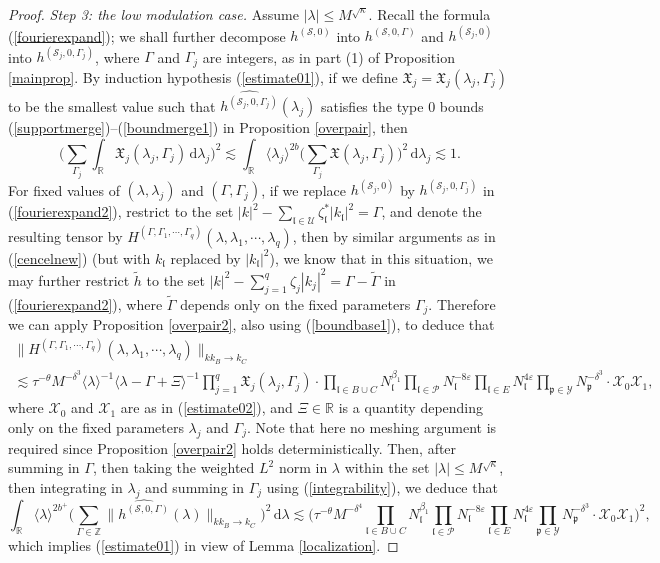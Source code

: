 \documentclass[11 pt,reqno]{amsart}
\theoremstyle{definition}
\theoremstyle{remark}
\numberwithin{equation}{section}
\newcommand{\Sc}{\mathcal{S}}
\newcommand{\Pc}{\mathcal{P}}
\newcommand{\Uc}{\mathcal{U}}
\newcommand{\Xc}{\mathcal{X}}
\newcommand{\Yc}{\mathcal{Y}}
\newcommand{\Rb}{\mathbb{R}}
\newcommand{\Zb}{\mathbb{Z}}
\newcommand{\pf}{\mathfrak{p}}
\newcommand{\Xf}{\mathfrak{X}}
\newcommand{\lf}{\mathfrak{l}}
\begin{document}
{\begin{proof}
\emph{Step 3: the low modulation case.} Assume $|\lambda|\leq M^{\sqrt{\kappa}}$. Recall the formula (\ref{fourierexpand}); we shall further decompose $h^{(\Sc,0)}$ into $h^{(\Sc,0,\Gamma)}$ and $h^{(\Sc_j,0)}$ into $h^{(\Sc_j,0,\Gamma_j)}$, where $\Gamma$ and $\Gamma_j$ are integers, as in part (1) of Proposition \ref{mainprop}. By induction hypothesis (\ref{estimate01}), if we define $\Xf_j=\Xf_j(\lambda_j,\Gamma_j)$ to be the smallest value such that $\widehat{h^{(\Sc_j,0,\Gamma_j)}}(\lambda_j)$ satisfies the type 0 bounds (\ref{supportmerge})--(\ref{boundmerge1}) in Proposition \ref{overpair}, then
\begin{equation}\label{integrability}\bigg(\sum_{\Gamma_j}\int_\Rb \Xf_j(\lambda_j,\Gamma_j)\,\mathrm{d}\lambda_j\bigg)^2\lesssim\int_\Rb\langle\lambda_j\rangle^{2b}\bigg(\sum_{\Gamma_j}\Xf(\lambda_j,\Gamma_j)\bigg)^{2}\,\mathrm{d}\lambda_j\lesssim 1.\end{equation} For fixed values of $(\lambda,\lambda_j)$ and $(\Gamma,\Gamma_j)$, if we replace $h^{(\Sc_j,0)}$ by $h^{(\Sc_j,0,\Gamma_j)}$ in (\ref{fourierexpand2}), restrict to the set $|k|^2-\sum_{\lf\in \Uc}\zeta_\lf^*|k_\lf|^2=\Gamma$, and denote the resulting tensor by $H^{(\Gamma,\Gamma_1,\cdots,\Gamma_q)}(\lambda,\lambda_1,\cdots,\lambda_q)$, then by similar arguments as in (\ref{cencelnew}) (but with $k_\lf$ replaced by $|k_\lf|^2$), we know that in this situation, we may further restrict $\widetilde{h}$ to the set $|k|^2-\sum_{j=1}^q\zeta_j|k_j|^2=\Gamma-\widetilde{\Gamma}$ in (\ref{fourierexpand2}), where $\widetilde{\Gamma}$ depends only on the fixed parameters $\Gamma_j$. Therefore we can apply Proposition \ref{overpair2}, also using (\ref{boundbase1}), to deduce that
\begin{multline}\label{atombd}\|H^{(\Gamma,\Gamma_1,\cdots,\Gamma_q)}(\lambda,\lambda_1,\cdots,\lambda_q)\|_{kk_B\to k_C}\\\lesssim\tau^{-\theta}M^{-\delta^3}\langle\lambda\rangle^{-1}\langle\lambda-\Gamma+\Xi\rangle^{-1}\prod_{j=1}^q\Xf_j(\lambda_j,\Gamma_j)\cdot\prod_{\lf\in B\cup C} N_\lf^{\beta_1}\prod_{\lf\in\Pc}N_\lf^{-8\varepsilon}\prod_{\lf\in E}N_\lf^{4\varepsilon}\prod_{\pf\in\Yc}N_\pf^{-\delta^3}\cdot\Xc_{0}\Xc_{1},
\end{multline} where $\Xc_0$ and $\Xc_1$ are as in (\ref{estimate02}), and $\Xi\in\Rb$ is a quantity depending only on the fixed parameters $\lambda_j$ and $\Gamma_j$. Note that here no meshing argument is required since Proposition \ref{overpair2} holds deterministically. Then, after summing in $\Gamma$, then taking the weighted $L^2$ norm in $\lambda$ within the set $|\lambda|\leq M^{\sqrt{\kappa}}$, then integrating in $\lambda_j$ and summing in $\Gamma_j$ using (\ref{integrability}), we deduce that
\[\int_\Rb\langle \lambda\rangle^{2b^+}\bigg(\sum_{\Gamma\in\Zb}\|\widehat{h^{(\Sc,0,\Gamma)}}(\lambda)\|_{kk_B\to k_C}\bigg)^2\,\mathrm{d}\lambda\lesssim\bigg(\tau^{-\theta}M^{-\delta^4}\prod_{\lf\in B\cup C}N_\lf^{\beta_1}\prod_{\lf\in\Pc}N_\lf^{-8\varepsilon}\prod_{\lf\in E}N_\lf^{4\varepsilon}\prod_{\pf\in\Yc}N_\pf^{-\delta^3}\cdot\Xc_0\Xc_1\bigg)^2,\] which implies (\ref{estimate01}) in view of Lemma \ref{localization}.
\end{proof}
}
\end{document}
